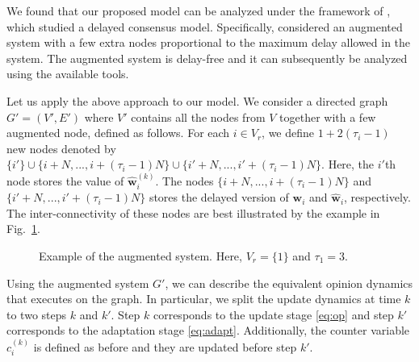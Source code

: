 \documentclass[letter]{article}
\theoremstyle{t}
\begin{document}
We found that our proposed model can be analyzed under the framework of \cite{}, which studied a delayed consensus model. Specifically, \cite{} considered an augmented system with a few extra nodes proportional to the maximum delay allowed in the system. The augmented system is delay-free and it can subsequently be analyzed using the available tools. 

Let us apply the above approach to our model. We consider a directed graph $G' = (V',E')$ where $V'$ contains all the nodes from $V$ together with a few augmented node, defined as follows. For each $i \in V_r$, we define $1 + 2(\tau_i - 1)$ new nodes denoted by $\{ i' \} \cup \{i + N, ..., i + (\tau_i-1)N\} \cup \{ i'+N, ..., i' + (\tau_i-1)N\}$. Here, the $i'$th node stores the value of $\hat{\bm w}_i^{(k)}$. The nodes $\{i + N, ..., i + (\tau_i-1)N\}$ and $\{ i'+N, ..., i' + (\tau_i-1)N\}$ stores the delayed version of ${\bm w}_i$ and $\hat{\bm w}_i$, respectively. The inter-connectivity of these nodes are best illustrated by the example in Fig.~\ref{fig:augment}. 

\begin{figure}[t]
\centerline{
}
\caption{Example of the augmented system. Here, $V_r = \{1\}$ and $\tau_1 = 3$. 
} \label{fig:augment}
\end{figure}

Using the augmented system $G'$, we can describe the equivalent opinion dynamics that executes on the graph. In particular, we split the update dynamics at time $k$ to two steps $k$ and $k'$. Step $k$ corresponds to the update stage \eqref{eq:op} and step $k'$ corresponds to the adaptation stage \eqref{eq:adapt}. 
Additionally, the counter variable $c_i^{(k)}$ is defined as before and they are updated before step $k'$. 
\end{document}
